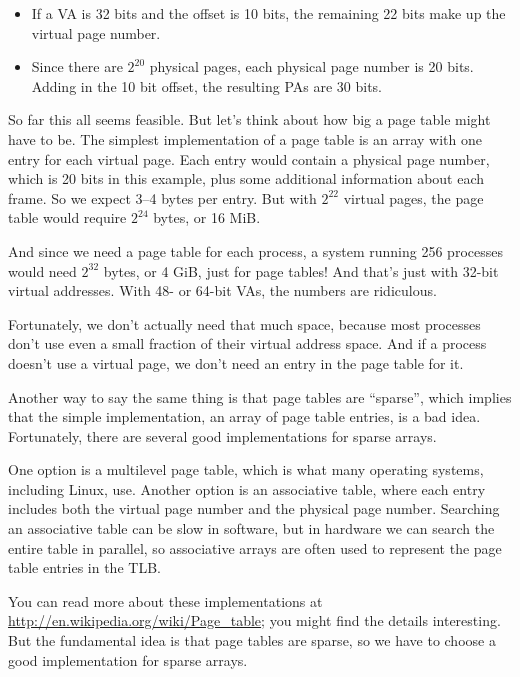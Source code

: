 \documentclass[12pt]{book}
\begin{document}
{\begin{itemize}
\item If a VA is 32 bits and the offset is 10 bits, the remaining
  22 bits make up the virtual page number.

\item Since there are $2^{20}$ physical pages, each physical page
  number is 20 bits.  Adding in the 10 bit offset, the resulting
  PAs are 30 bits.

\end{itemize}

So far this all seems feasible.  But let's think about how big a page
table might have to be.  The simplest implementation of a page
table is an array with one entry for each virtual page.
Each entry would contain a physical page number, which is 20 bits
in this example, plus some additional information about each
frame.  So we expect 3--4 bytes per entry.  But with $2^{22}$ virtual pages,
the page table would require $2^{24}$ bytes, or 16 MiB.

And since we need a page table for each process, a system running
256 processes would need $2^{32}$ bytes, or 4 GiB, just for page tables!
And that's just with 32-bit virtual addresses.  With 48- or 64-bit
VAs, the numbers are ridiculous.

Fortunately, we don't actually need that much space, because
most processes don't use even a small fraction of their
virtual address space.  And if a process doesn't use a virtual
page, we don't need an entry in the page table for it.

Another way to say the same thing is that page tables are ``sparse'',
which implies that the simple implementation, an array of page
table entries, is a bad idea.  Fortunately, there are several
good implementations for sparse arrays.

One option is a multilevel page table, which is what many operating
systems, including Linux, use.  Another option is an associative table, where each entry includes both the virtual page number and the physical page number.  Searching an associative table can be slow in software, but in hardware we
can search the entire table in parallel, so associative arrays are
often used to represent the page table entries in the TLB.

You can read more about these implementations at
\url{http://en.wikipedia.org/wiki/Page_table}; you might find the
details interesting.  But the fundamental idea is that page tables are
sparse, so we have to choose a good implementation for sparse arrays.

}
\end{document}
